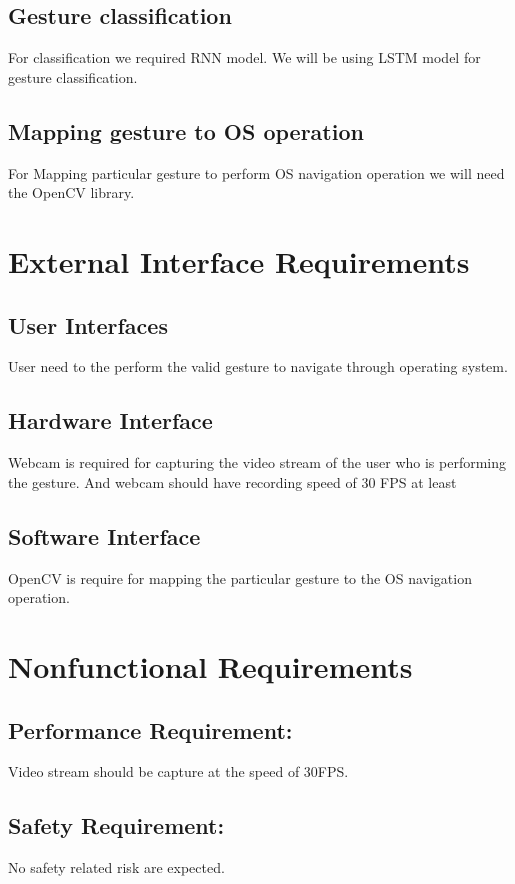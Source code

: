 \documentclass[oneside,a4paper,12pt]{report}
\begin{document}
        \subsection{Gesture classification}
            For classification we required RNN model. We will be using LSTM model for gesture classification. 
        \subsection{Mapping gesture to OS operation}
            For Mapping particular gesture to perform OS navigation operation we will need the OpenCV library. 

    
    
    
    \section{External Interface Requirements}
        \subsection{User Interfaces}
        User need to the perform the valid gesture to navigate through operating system. 
        \subsection{Hardware Interface}
        Webcam is required for capturing the video stream of the user who is performing the gesture. And webcam should have recording speed of 30 FPS at least
        \subsection{Software Interface}
        OpenCV is require for mapping the particular gesture to the OS navigation operation. 

    
    
    \section{Nonfunctional Requirements}
        \subsection{Performance Requirement: }
        Video stream should be capture at the speed of 30FPS.
        \subsection{Safety Requirement: }
        No safety related risk are expected.
\end{document}
